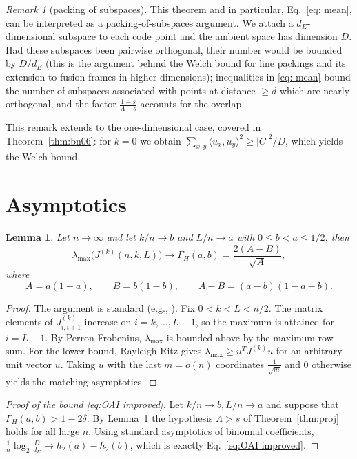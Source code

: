 \documentclass[11pt]{amsart}
\theoremstyle{plain}
\newtheorem{lemma}[theorem]{Lemma}
\theoremstyle{remark}
\newtheorem{remark}[theorem]{Remark}
\newcommand{\la}{\langle}
\newcommand{\ra}{\rangle}
\newcommand{\lmax}{\lambda_{\max}}
\begin{document}
\begin{remark}[packing of subspaces]\label{rem: packing}
    This theorem and in particular, Eq.~\eqref{eq: mean}, can be interpreted as a packing-of-subspaces argument. We attach a $d_E$-dimensional subspace to each code point and the ambient space has dimension $D$. Had these subspaces been pairwise orthogonal,
    their number would be bounded by $D/d_E$ (this is the argument behind the Welch bound for line packings
    and its extension to fusion frames in higher dimensions); inequalities in \eqref{eq: mean} bound
    the number of subspaces associated with points at distance $\ge d$ which are nearly orthogonal, and the
    factor $\frac{1-s}{\Lambda-s}$ accounts for the overlap.

    This remark extends to the one-dimensional case, covered in Theorem~\ref{thm:bn06}: for $k=0$ we obtain $\sum_{x,y}\la u_x,u_y\ra^2\ge |C|^2/D$, which yields the Welch bound.        
\end{remark}


\section{Asymptotics}\label{sec:asympt}

\begin{lemma}\label{lem:eig} Let $n\to\infty$ and let
$k/n\to b$ and $L/n\to a$ with $0\le b<a\le1/2$, then
\[
 \lmax\bigl(J^{(k)}(n,k,L)\bigr)\longrightarrow\Gamma_H(a,b)
 =\frac{2(A-B)}{\sqrt A},
\]
where
  \begin{equation}\label{eq: AB}
  A=a(1-a),\qquad B=b(1-b),\qquad
A-B=(a-b)(1-a-b).
  \end{equation}
\end{lemma}

\begin{proof} The argument is standard (e.g., \cite[Lemma 2.3]{BN06}).
    Fix $0<k<L<n/2$. The matrix elements of $J_{i,i+1}^{(k)}$ increase on $i=k,\dots,L-1$, so the maximum is attained for $i=L-1$. By Perron-Frobenius, $\lmax$ is bounded above
    by the maximum row sum. For the lower bound, Rayleigh-Ritz gives 
    $\lmax \ge {u^T J^{(k)}u}$ for an arbitrary unit vector $u$. Taking $u$ with 
 the last $m=o(n)$ coordinates $\frac1{\sqrt m}$ and $0$ otherwise yields the matching asymptotics.
\end{proof}

\begin{proof}[Proof of the bound \eqref{eq:OAI improved}]
Let $k/n\to b, L/n\to a$ and suppose that $\Gamma_H(a,b)>1-2\delta$. By Lemma~\ref{lem:eig} the
hypothesis $\Lambda>s$ of Theorem~\ref{thm:proj} holds for all large $n$. Using standard asymptotics
of binomial coefficients, $\frac 1n\log_2\frac D{d_E}\to h_2(a)-h_2(b)$, which is exactly Eq.~\eqref{eq:OAI improved}.\qedhere

\end{proof}
\end{document}
